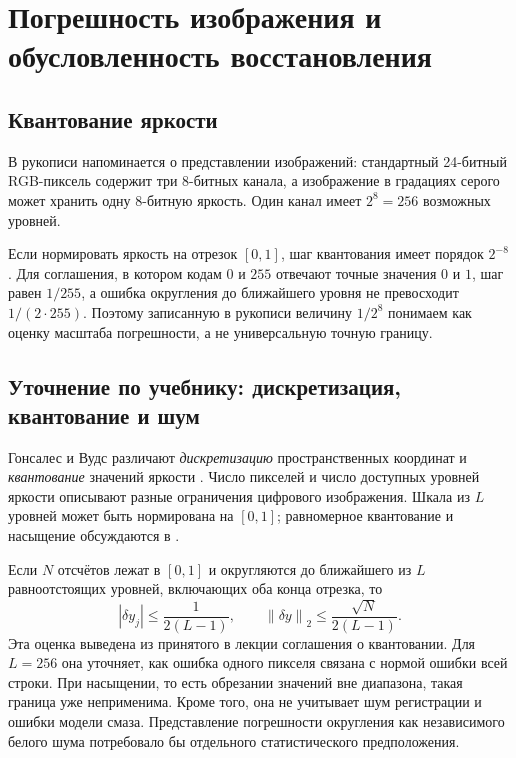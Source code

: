\documentclass[12pt,a4paper]{article}
\theoremstyle{definition}
\theoremstyle{remark}
\newcommand{\norm}[1]{\left\lVert #1\right\rVert}
\begin{document}
\section{Погрешность изображения и обусловленность восстановления}

\subsection{Квантование яркости}

В рукописи напоминается о представлении изображений: стандартный
24-битный RGB-пиксель содержит три 8-битных канала, а изображение в
градациях серого может хранить одну 8-битную яркость. Один канал имеет
$2^8=256$ возможных уровней.

Если нормировать яркость на отрезок $[0,1]$, шаг квантования имеет
порядок $2^{-8}$. Для соглашения, в котором кодам $0$ и $255$ отвечают
точные значения $0$ и $1$, шаг равен $1/255$, а ошибка округления до
ближайшего уровня не превосходит $1/(2\cdot255)$. Поэтому записанную
в рукописи величину $1/2^8$ понимаем как оценку масштаба погрешности,
а не универсальную точную границу.

\subsection{Уточнение по учебнику: дискретизация, квантование и шум}

Гонсалес и Вудс различают \emph{дискретизацию} пространственных
координат и \emph{квантование} значений яркости
\cite[\S\,2.4.1, с.~85]{GW2012}.
Число пикселей и число доступных уровней яркости описывают разные
ограничения цифрового изображения. Шкала из $L$ уровней может быть
нормирована на $[0,1]$; равномерное квантование и насыщение
обсуждаются в \cite[\S\,2.4, с.~90--91]{GW2012}.

Если $N$ отсчётов лежат в $[0,1]$ и округляются до ближайшего
из $L$ равноотстоящих уровней, включающих оба конца отрезка, то
\[
  |\delta y_j|\leqslant\frac1{2(L-1)},\qquad
  \norm{\delta y}_2\leqslant\frac{\sqrt N}{2(L-1)}.
\]
Эта оценка выведена из принятого в лекции соглашения о квантовании.
Для $L=256$ она уточняет, как ошибка одного пикселя связана
с нормой ошибки всей строки. При насыщении, то есть обрезании
значений вне диапазона, такая граница уже неприменима.
Кроме того, она не учитывает шум регистрации и ошибки модели смаза.
Представление погрешности округления как независимого белого шума
потребовало бы отдельного статистического предположения.
\end{document}
